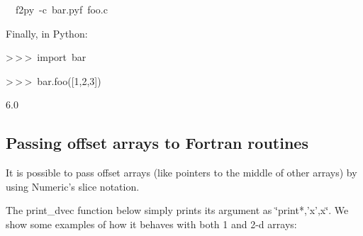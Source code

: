 \begin{lyxcode}
~~f2py~-c~bar.pyf~foo.c
\end{lyxcode}
Finally, in Python:

\begin{lyxcode}
>\,{}>\,{}>~import~bar

>\,{}>\,{}>~bar.foo({[}1,2,3])

6.0
\end{lyxcode}

\subsection{Passing offset arrays to Fortran routines}

It is possible to pass offset arrays (like pointers to the middle
of other arrays) by using Numeric's slice notation.

The print\_dvec function below simply prints its argument as \char`\"{}print{*},'x',x\char`\"{}.
We show some examples of how it behaves with both 1 and 2-d arrays: 

